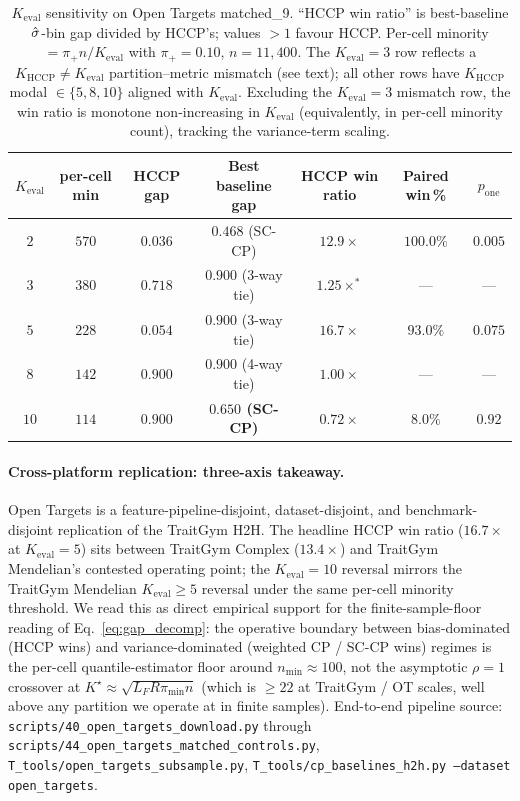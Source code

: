 \begin{table}[h]
\centering
\small
\caption{$K_{\mathrm{eval}}$ sensitivity on Open Targets matched\_9. ``HCCP win
ratio'' is best-baseline $\hat{\sigma}$-bin gap divided by HCCP's; values $> 1$
favour HCCP. Per-cell minority $= \pi_{+} n / K_{\mathrm{eval}}$ with
$\pi_{+} = 0.10$, $n = 11{,}400$. The $K_{\mathrm{eval}} = 3$ row reflects
a $K_{\mathrm{HCCP}} \neq K_{\mathrm{eval}}$ partition--metric mismatch
(see text); all other rows have $K_{\mathrm{HCCP}}$ modal $\in
\{5, 8, 10\}$ aligned with $K_{\mathrm{eval}}$. Excluding the $K_{\mathrm{eval}}
= 3$ mismatch row, the win ratio is monotone non-increasing in
$K_{\mathrm{eval}}$ (equivalently, in per-cell minority count), tracking
the variance-term scaling.}
\label{tab:open_targets_keval}
\setlength{\tabcolsep}{4pt}
\begin{tabular}{ccccccc}
\toprule
$K_{\mathrm{eval}}$ & per-cell min & HCCP gap & Best baseline gap
                    & HCCP win ratio & Paired win\,\% & $p_{\mathrm{one}}$ \\
\midrule
$2$  & $570$ & $\mathbf{0.036}$ & $0.468$ (SC-CP) & $\mathbf{12.9\times}$ & $\mathbf{100.0\%}$ & $\mathbf{0.005}$ \\
$3$  & $380$ & $0.718$           & $0.900$ (3-way tie) & $1.25\times^{*}$ & --- & --- \\
$5$  & $228$ & $\mathbf{0.054}$ & $0.900$ (3-way tie) & $\mathbf{16.7\times}$ & $93.0\%$ & $0.075$ \\
$8$  & $142$ & $0.900$           & $0.900$ (4-way tie) & $1.00\times$  & --- & --- \\
$10$ & $114$ & $0.900$           & \textbf{$0.650$ (SC-CP)} & $\mathbf{0.72\times}$ & $\mathbf{8.0\%}$ & $\mathbf{0.92}$ \\
\bottomrule
\end{tabular}
\end{table}

\paragraph{Cross-platform replication: three-axis takeaway.}
Open Targets is a feature-pipeline-disjoint, dataset-disjoint, and
benchmark-disjoint replication of the TraitGym H2H. The headline HCCP win
ratio ($16.7\times$ at $K_{\mathrm{eval}} = 5$) sits between TraitGym
Complex ($13.4\times$) and TraitGym Mendelian's contested operating point;
the $K_{\mathrm{eval}} = 10$ reversal mirrors the TraitGym Mendelian
$K_{\mathrm{eval}} \geq 5$ reversal under the same per-cell minority
threshold. We read this as direct empirical support for the
finite-sample-floor reading of Eq.~\eqref{eq:gap_decomp}: the operative
boundary between bias-dominated (HCCP wins) and variance-dominated
(weighted CP / SC-CP wins) regimes is the per-cell quantile-estimator
floor around $n_{\min} \approx 100$, not the asymptotic $\rho = 1$
crossover at $K^\star \approx \sqrt{L_F R \pi_{\min} n}$ (which is
$\geq 22$ at TraitGym / OT scales, well above any partition we operate at
in finite samples). End-to-end pipeline source:
\texttt{scripts/40\_open\_targets\_download.py} through
\texttt{scripts/44\_open\_targets\_matched\_controls.py},
\texttt{T\_tools/open\_targets\_subsample.py},
\texttt{T\_tools/cp\_baselines\_h2h.py --dataset open\_targets}.
